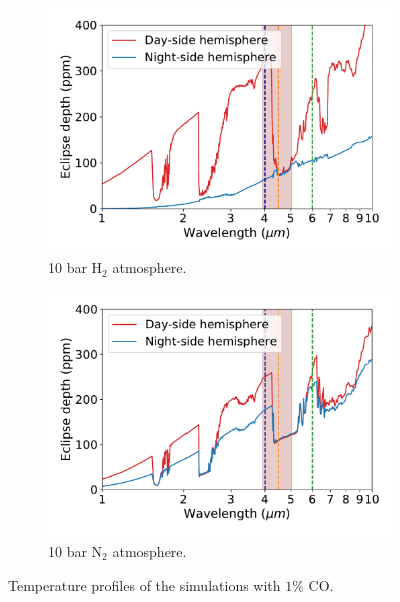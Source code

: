 \begin{figure}
  \centering
  \begin{subfigure}[t]{0.49\textwidth}
    \includegraphics[width=\textwidth]{figures/soc-lava-planets/n2-emission-spec.pdf}
    \caption{10 bar H$_{2}$ atmosphere.}\label{fig:soc-tp-h2}
  \end{subfigure}
  \begin{subfigure}[t]{0.49\textwidth}
    \includegraphics[width=\textwidth]{figures/soc-lava-planets/h2-emission-spec.pdf}
    \caption{10 bar N$_{2}$ atmosphere.}\label{fig:soc-tp-n2}
  \end{subfigure}
  \caption{Temperature profiles of the simulations with $1\%$ CO.}
  \label{fig:soc-tp}
\end{figure}



